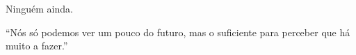 \documentclass[oneside]{normas-utf-tex} %
\begin{document}
\begin{agradecimentos}
Ninguém ainda.
\end{agradecimentos}
\begin{epigrafe}
“Nós só podemos ver um pouco do futuro, mas o suficiente para perceber que há muito a fazer.”
\end{epigrafe}


\listadesiglas %

\sumario %




\setlength{\parskip}{0.0cm}












%
%
%
%
\end{document}
